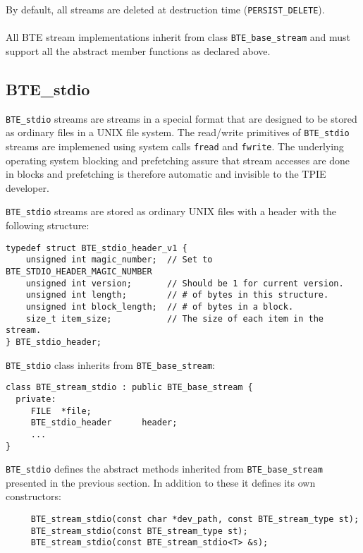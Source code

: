 By default, all streams are deleted at destruction time
(\verb|PERSIST_DELETE|).  
\\ \\
All BTE stream implementations inherit from class \verb|BTE_base_stream|
and must support all the abstract member functions as declared above.




\subsection{BTE\_stdio}

\verb|BTE_stdio| streams are streams in a special format that are designed
to be stored as ordinary files in a UNIX file system.  The read/write
primitives of \verb|BTE_stdio| streams are implemened using system calls
\verb|fread| and \verb|fwrite|. The underlying operating system blocking
and prefetching assure that stream accesses are done in blocks and
prefetching is therefore automatic and invisible to the TPIE developer.

\verb|BTE_stdio| streams are stored as ordinary UNIX files with a header
with the following structure:

\begin{verbatim}
typedef struct BTE_stdio_header_v1 { 
    unsigned int magic_number;  // Set to BTE_STDIO_HEADER_MAGIC_NUMBER
    unsigned int version;       // Should be 1 for current version.
    unsigned int length;        // # of bytes in this structure.
    unsigned int block_length;  // # of bytes in a block.
    size_t item_size;           // The size of each item in the stream.
} BTE_stdio_header;
\end{verbatim}

\verb|BTE_stdio| class inherits from \verb|BTE_base_stream|:
\begin{verbatim}
class BTE_stream_stdio : public BTE_base_stream {
  private:
     FILE  *file;          
     BTE_stdio_header      header;
     ...
}  
\end{verbatim}

\verb|BTE_stdio| defines the abstract methods inherited from
\verb|BTE_base_stream| presented in the previous section. In addition to
these it defines its own constructors:
\begin{verbatim}
     BTE_stream_stdio(const char *dev_path, const BTE_stream_type st); 
     BTE_stream_stdio(const BTE_stream_type st); 
     BTE_stream_stdio(const BTE_stream_stdio<T> &s);
\end{verbatim}

